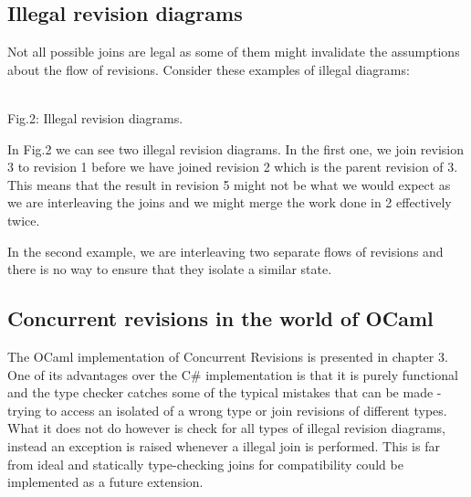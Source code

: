 \documentclass[12pt,twoside,notitlepage]{report}
\begin{document}
\subsection{Illegal revision diagrams}
Not all possible joins are legal as some of them might invalidate the assumptions about the flow of revisions. Consider these examples of illegal diagrams:

\\Fig.2: Illegal revision diagrams.
\vspace{10pt}

In Fig.2 we can see two illegal revision diagrams. In the first one, we join revision 3 to revision 1 before we have joined revision 2 which is the parent revision of 3. This means that the result in revision 5 might not be what we would expect as we are interleaving the joins and we might merge the work done in 2 effectively twice.

In the second example, we are interleaving two separate flows of revisions and there is no way to ensure that they isolate a similar state.

\subsection{Concurrent revisions in the world of OCaml}
The OCaml implementation of Concurrent Revisions is presented in chapter 3. One of its advantages over the C\# implementation is that it is purely functional and the type checker catches some of the typical mistakes that can be made - trying to access an isolated of a wrong type or join revisions of different types. What it does not do however is check for all types of illegal revision diagrams, instead an exception is raised whenever a illegal join is performed. This is far from ideal and statically type-checking joins for compatibility could be implemented as a future extension.
\end{document}
